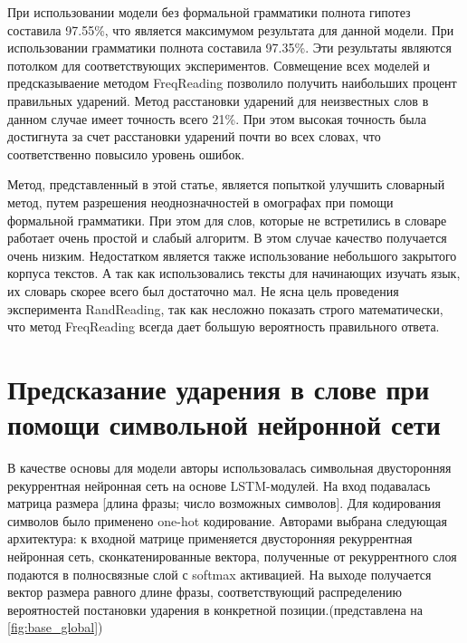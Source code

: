 \documentclass[14pt, a4paper, russian]{report}
\begin{document}
\begin{normalsize}
\begin{table}[H]
\end{table}

При использовании модели без формальной грамматики полнота гипотез составила 97.55\%, что является максимумом результата для данной модели. При использовании грамматики полнота составила 97.35\%. Эти результаты являются потолком для соответствующих экспериментов. Совмещение всех моделей и предсказываение методом FreqReading  позволило получить наибольших процент правильных ударений. Метод расстановки ударений для неизвестных слов в данном случае имеет точность всего 21\%. При этом высокая точность была достигнута за счет расстановки ударений почти во всех словах, что соответственно повысило уровень ошибок. 

Метод, представленный в этой статье, является попыткой улучшить словарный метод, путем разрешения неоднозначностей в омографах при помощи формальной грамматики. При этом для слов, которые не  встретились в словаре работает очень простой и слабый алгоритм. В этом случае качество получается очень низким. Недостатком является также использование небольшого закрытого корпуса текстов. А так как использовались тексты для начинающих изучать язык, их словарь скорее всего был достаточно мал. Не ясна цель проведения эксперимента RandReading, так как несложно показать строго математически, что метод FreqReading всегда дает большую вероятность правильного ответа.

\section{Предсказание ударения в слове при помощи символьной нейронной сети}
	В качестве основы для модели авторы \cite{ponomareva} использовалась  символьная двусторонняя рекуррентная нейронная сеть на основе LSTM-модулей. На вход подавалась матрица размера [длина фразы; число возможных символов]. Для кодирования символов было применено one-hot кодирование. Авторами выбрана следующая архитектура: к входной матрице применяется двусторонняя рекуррентная нейронная сеть, сконкатенированные вектора, полученные от рекуррентного слоя подаются в полносвязные слой с softmax активацией. На выходе получается вектор размера равного длине фразы, соответствующий распределению вероятностей постановки ударения в конкретной позиции.(представлена на \cref{fig:base_global})


\end{normalsize}
\end{document}

